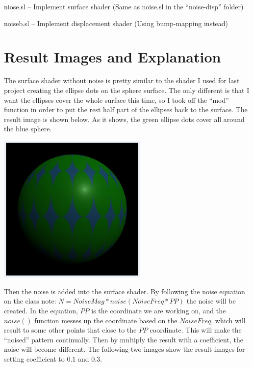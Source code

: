 \documentclass[letterpaper,14pt,titlepage,fleqn]{article}
\begin{document}
niose.sl -- Implement surface shader (Same as noise.sl in the ``noise-disp'' folder)

noiseb.sl -- Implement displacement shader (Using bump-mapping instead)

\section{Result Images and Explanation}
The surface shader without noise is pretty similar to the shader I used for last project creating the ellipse dots on the sphere surface. The only different is that I want the ellipses cover the whole surface this time, so I took off the ``mod'' function in order to put the rest half part of the ellipses back to the surface. The result image is shown below. As it shows, the green ellipse dots cover all around the blue sphere.
\begin{center}
	\includegraphics[width=2.9in]{surface_mag_00.jpg}
\end{center}
Then the noise is added into the surface shader. By following the noise equation on the class note: $N = NoiseMag * noise( NoiseFreq * PP )$ the noise will be created. In the equation, $PP$ is the coordinate we are working on, and the $noise()$ function messes up the coordinate based on the $NoiseFreq$, which will result to some other points that close to the $PP$ coordinate. This will make the ``noised'' pattern continually. Then by multiply the result with a coefficient, the noise will become different. The following two images show the result images for setting coefficient to $0.1$ and $0.3$.
\end{document}
